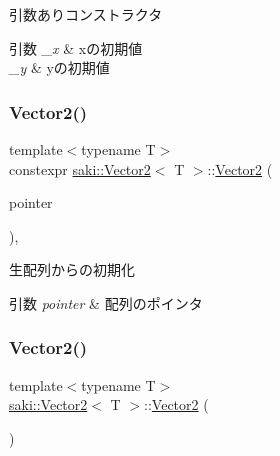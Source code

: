 引数ありコンストラクタ 


\begin{DoxyParams}{引数}
{\em \+\_\+x} & xの初期値 \\
\hline
{\em \+\_\+y} & yの初期値 \\
\hline
\end{DoxyParams}
\mbox{\label{classsaki_1_1_vector2_ac15263f1583a51e451b5089058fca60e}} 
\subsubsection{\texorpdfstring{Vector2()}{Vector2()}\hspace{0.1cm}{\footnotesize\ttfamily [3/5]}}
{\footnotesize\ttfamily template$<$typename T$>$ \\
constexpr \mbox{\hyperlink{classsaki_1_1_vector2}{saki\+::\+Vector2}}$<$ T $>$\+::\mbox{\hyperlink{classsaki_1_1_vector2}{Vector2}} (\begin{DoxyParamCaption}\item[{const\+\_\+pointer const}]{pointer }\end{DoxyParamCaption})\hspace{0.3cm}{\ttfamily [inline]}, {\ttfamily [explicit]}}



生配列からの初期化 


\begin{DoxyParams}{引数}
{\em pointer} & 配列のポインタ \\
\hline
\end{DoxyParams}
\mbox{\label{classsaki_1_1_vector2_a4b18314464e9f80aa053af5309fe4d6b}} 
\subsubsection{\texorpdfstring{Vector2()}{Vector2()}\hspace{0.1cm}{\footnotesize\ttfamily [4/5]}}
{\footnotesize\ttfamily template$<$typename T$>$ \\
\mbox{\hyperlink{classsaki_1_1_vector2}{saki\+::\+Vector2}}$<$ T $>$\+::\mbox{\hyperlink{classsaki_1_1_vector2}{Vector2}} (\begin{DoxyParamCaption}\item[{const \mbox{\hyperlink{classsaki_1_1_vector2}{Vector2}}$<$ value\+\_\+type $>$ \&}]{ }\end{DoxyParamCaption})\hspace{0.3cm}{\ttfamily [default]}}

